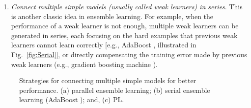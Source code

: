 \documentclass[journal,twocolumn]{IEEEtran}
\begin{document}
\begin{enumerate}
\item \emph{Connect multiple simple models (usually called weak learners) in series}. This is another classic idea in ensemble learning. For example, when the performance of a weak learner is not enough, multiple weak learners can be generated in series, each focusing on the hard examples that previous weak learners cannot learn correctly [e.g., AdaBoost \cite{Freund1997a}, illustrated in Fig.~\ref{fig:Serial}], or directly compensating the training error made by previous weak learners (e.g., gradient boosting machine \cite{Friedman2001}).
\end{enumerate}

\begin{figure}[htbp]\centering
{}
\caption{Strategies for connecting multiple simple models for better performance. (a) parallel ensemble learning; (b) serial ensemble learning (AdaBoost \cite{Freund1997a}); and, (c) PL.} \label{fig:EL}
\end{figure}
\end{document}

